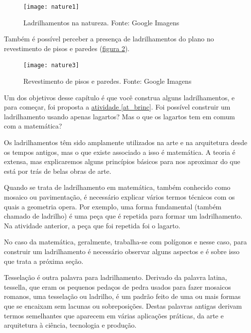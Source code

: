 \begin{figure}[H]
\centering
\texttt{[image: nature1]}
\caption{Ladrilhamentos na natureza. Fonte: Google Imagens}
\label{natureza}
\end{figure}

Também é possível perceber a presença de ladrilhamentos do plano no revestimento de pisos e paredes (\hyperref[natureza1]{figura \ref{natureza1}}). 


\begin{figure}[H]
\centering
\texttt{[image: nature3]}
\caption{Revestimento de pisos e paredes. Fonte: Google Imagens}
\label{natureza1}
\end{figure}

Um dos objetivos desse capítulo é que você construa alguns ladrilhamentos, e para começar, foi proposta a \hyperref[at_brinc]{atividade \ref{at_brinc}}. Foi possível construir um ladrilhamento usando apenas lagartos?  Mas o que os lagartos tem em comum com a matemática? 

Os ladrilhamentos têm sido amplamente utilizados na arte e na arquitetura desde os tempos antigos, mas o que existe associado a isso é  matemática. A teoria é extensa, mas explicaremos alguns princípios básicos para nos aproximar do que está por trás de belas obras de arte. 

Quando se trata de ladrilhamento em matemática, também conhecido como mosaico ou pavimentação, é necessário explicar vários termos técnicos com os quais a geometria opera. Por exemplo, uma forma fundamental (também chamado de ladrilho) é uma peça que é repetida para formar um ladrilhamento. Na atividade anterior, a peça que foi repetida foi o lagarto.


No caso da matemática, geralmente, trabalha-se com polígonos e nesse caso, para construir um ladrilhamento é necessário observar alguns aspectos e é sobre isso que trata a próxima seção.


 \label{tess}

Tesselação é outra palavra para ladrilhamento. Derivado da palavra latina, tessella, que eram os pequenos pedaços de pedra usados para fazer mosaicos romanos, uma tesselação ou ladrilho, é um padrão feito de uma ou mais formas que se encaixam sem lacunas ou sobreposições.
Destas palavras antigas derivam termos semelhantes que aparecem em várias aplicações práticas, da arte e arquitetura à ciência, tecnologia e produção.

